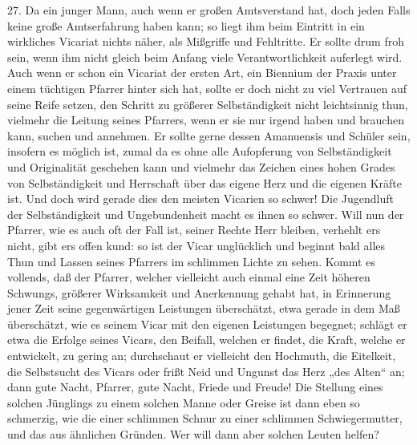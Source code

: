 27. Da ein junger Mann, auch wenn er großen Amtsverstand hat, doch jeden Falls keine große Amtserfahrung haben kann; so liegt ihm beim Eintritt in ein wirkliches Vicariat nichts näher, als Mißgriffe und Fehltritte. Er sollte drum froh sein, wenn ihm nicht gleich beim Anfang viele Verantwortlichkeit auferlegt wird. Auch wenn er schon ein Vicariat der ersten Art, ein Biennium der Praxis unter einem tüchtigen Pfarrer hinter sich hat, sollte er doch nicht zu viel Vertrauen auf seine Reife setzen, den Schritt zu größerer Selbständigkeit nicht leichtsinnig thun, vielmehr die Leitung seines Pfarrers, wenn er sie nur irgend haben und brauchen kann, suchen und annehmen. Er sollte gerne dessen Amanuensis und Schüler sein, insofern es möglich ist, zumal da es ohne alle Aufopferung von Selbständigkeit und Originalität geschehen kann und vielmehr das Zeichen eines hohen Grades von Selbständigkeit und Herrschaft über das eigene Herz und die eigenen Kräfte ist. Und doch wird gerade dies den meisten Vicarien so schwer! Die Jugendluft der Selbständigkeit und Ungebundenheit macht es ihnen so schwer. Will nun der Pfarrer, wie es auch oft der Fall ist, seiner Rechte Herr bleiben, verhehlt ers nicht, gibt ers offen kund: so ist der Vicar unglücklich und beginnt bald alles Thun und Lassen seines Pfarrers im schlimmen Lichte zu sehen. Kommt es vollends, daß der
Pfarrer, welcher vielleicht auch einmal eine Zeit höheren Schwungs, größerer Wirksamkeit und Anerkennung gehabt hat, in Erinnerung jener Zeit seine gegenwärtigen Leistungen überschätzt, etwa gerade in dem Maß überschätzt, wie es seinem Vicar mit den eigenen Leistungen begegnet; schlägt er etwa die Erfolge seines Vicars, den Beifall, welchen er findet, die Kraft, welche er entwickelt, zu gering an; durchschaut er vielleicht den Hochmuth, die Eitelkeit, die Selbstsucht des Vicars oder frißt Neid und Ungunst das Herz „des Alten“ an; dann gute Nacht, Pfarrer, gute Nacht, Friede und Freude! Die Stellung eines solchen Jünglings zu einem solchen Manne oder Greise ist dann eben so schmerzig, wie die einer schlimmen Schnur zu einer schlimmen Schwiegermutter, und das aus ähnlichen Gründen. Wer will dann aber solchen Leuten helfen?


